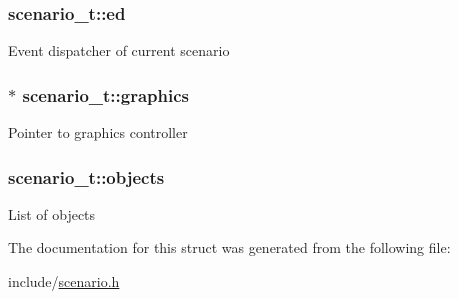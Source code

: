 \subsubsection[{\texorpdfstring{ed}{ed}}]{ scenario\+\_\+t\+::ed}\hypertarget{structscenario__t_a8687b4f6cafb5c9d4e1b324cc8d5c7c9}{}\label{structscenario__t_a8687b4f6cafb5c9d4e1b324cc8d5c7c9}
Event dispatcher of current scenario 
\subsubsection[{\texorpdfstring{graphics}{graphics}}]{$\ast$ scenario\+\_\+t\+::graphics}\hypertarget{structscenario__t_a00790b5954aa1761fec84cbd3319ed16}{}\label{structscenario__t_a00790b5954aa1761fec84cbd3319ed16}
Pointer to graphics controller 
\subsubsection[{\texorpdfstring{objects}{objects}}]{ scenario\+\_\+t\+::objects}\hypertarget{structscenario__t_ab01a8a6fa25d26374ff9b261e7512c1c}{}\label{structscenario__t_ab01a8a6fa25d26374ff9b261e7512c1c}
List of objects 

The documentation for this struct was generated from the following file\+:\begin{DoxyCompactItemize}
\item 
include/\hyperlink{scenario_8h}{scenario.\+h}\end{DoxyCompactItemize}
